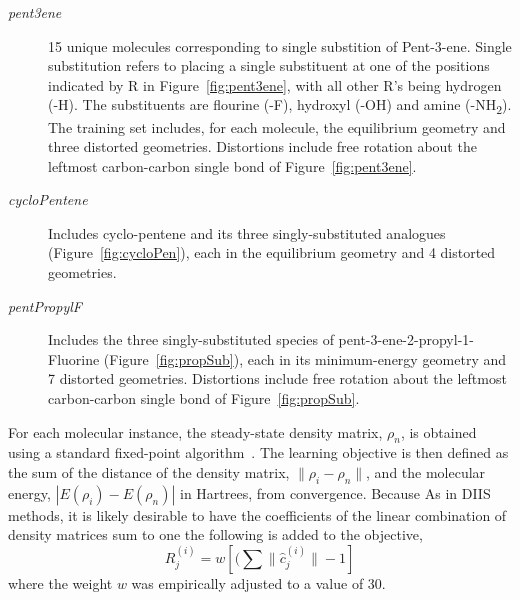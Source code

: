 \documentclass[twoside,11pt]{article}
\begin{document}
\begin{description}
\item[\textit{pent3ene}] 15 unique molecules corresponding to single substition of Pent-3-ene. Single substitution refers to placing a single substituent at one of the positions indicated by R in Figure~\ref{fig:pent3ene}, with all other R's being hydrogen (-H). The substituents are flourine (-F), hydroxyl (-OH) and amine (-NH\textsubscript{2}). The training set includes, for each molecule, the equilibrium geometry and three distorted geometries. Distortions include free rotation about the leftmost carbon-carbon single bond of Figure~\ref{fig:pent3ene}. 
\item[\textit{cycloPentene}]Includes cyclo-pentene and its three singly-substituted analogues (Figure~\ref{fig:cycloPen}), each in the equilibrium geometry and 4 distorted geometries. 
\item[\textit{pentPropylF}] Includes the three singly-substituted species of pent-3-ene-2-propyl-1-Fluorine (Figure~\ref{fig:propSub}), each in its minimum-energy geometry and 7 distorted geometries. Distortions include free rotation about the leftmost carbon-carbon single bond of Figure~\ref{fig:propSub}. 
\end{description}

For each molecular instance, the steady-state density matrix, $\rho_n$, is obtained using a standard fixed-point algorithm~\cite{Pulay1980}. The learning objective is then defined as the sum of the distance of the density matrix, $\|\rho_i-\rho_n\|$, and the molecular energy, $|E(\rho_i)-E(\rho_n)|$ in Hartrees, from convergence. Because As in DIIS methods, it is likely desirable to have the coefficients of the linear combination of density matrices sum to one\cite{scusceria} the following is added to the objective,
\begin{equation}
R^{(i)}_j =  w [(\sum \|\hat{c}^{(i)}_j\| - 1]
\end{equation}
where the weight $w$ was empirically adjusted to a value of 30. 
\end{document}
